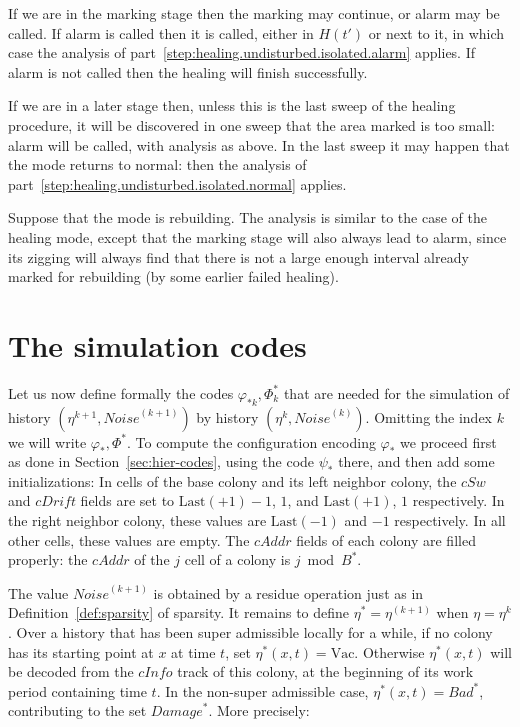 \documentclass[12pt]{memoir}
\newcommand{\authnote}[3]
{\text{{ \textcolor{#3}{\( \langle\hspace{-0.2em}\langle \)\textsf{\footnotesize #1: #2}\( \rangle\hspace{-0.2em}\rangle \)}}}}
\newcommand{\authnote}[2]{}
\newcommand{\Pnote}[1]{{\authnote{Peter}{#1}{cyan}}}
\newcommand{\fld}[1]{\ensuremath{\textit{#1}}}
\def\B{B}
\newcommand{\Bad}{\mathit{Bad}}
\newcommand{\Damage}{\mathit{Damage}}
\renewcommand{\H}{H}
\newcommand{\Noise}{\mathit{Noise}}
\newcommand{\cAddr}{\fld{cAddr}}
\newcommand{\cDrift}{\fld{cDrift}}
\newcommand{\cInfo}{\fld{cInfo}}
\newcommand{\cSweep}{\fld{cSw}}
\newcommand{\Last}{\mathrm{Last}}
\newcommand{\Vacant}{\mathrm{Vac}}
\begin{document}
\begin{Proof}
\begin{prooofi}
If we are in the marking stage then the marking may continue, or alarm may be called.
If alarm is called then it is called, either in \( \H(t') \) or next to it, in which case 
the analysis of part~\ref{step:healing.undisturbed.isolated.alarm} applies.
If alarm is not called then the healing will finish successfully.

If we are in a later stage then, unless this is the last sweep of the healing procedure,
it will be discovered in one sweep that the area marked is too small: alarm will be called,
with analysis as above.
In the last sweep it may happen that the mode returns to normal: then the
analysis of part~\ref{step:healing.undisturbed.isolated.normal} applies.

Suppose that the mode is rebuilding.
The analysis is similar to the case of the healing mode, except that
the marking stage will also always lead to alarm, since its zigging will
always find that there is not a large enough interval already marked for rebuilding
(by some earlier failed healing).
\end{prooofi} %
\end{Proof}


\section{The simulation codes}

Let us now define formally the codes \( \varphi_{*k},\Phi_{k}^{*} \) that are needed
for the simulation of history \( (\eta^{k+1},\Noise^{(k+1)}) \) by history \( (\eta^{k},\Noise^{(k)}) \).
Omitting the index \( k \) we will write \( \varphi_{*},\Phi^{*} \).
To compute the configuration encoding \( \varphi_{*} \) we proceed first as
done in Section~\ref{sec:hier-codes}, using the code \( \psi_{*} \) there,
and then add some initializations:
In cells of the base colony and its left neighbor  colony,
the \( \cSweep \) and \( \cDrift \) fields are set 
to \( \Last(+1)-1 \),  \( 1 \), and \( \Last(+1) \),  \( 1 \) respectively.
In the right neighbor colony, these values are \( \Last(-1) \) and \( -1 \) respectively.
In all other cells, these values are empty.
The \( \cAddr \) fields of each colony are filled properly:
the \( \cAddr \) of the \( j \) cell of a colony
is \( j \bmod \B^* \). \Pnote{Picture?}

The value \( \Noise^{(k+1)} \) is obtained by a residue operation
just as in Definition~\ref{def:sparsity} of sparsity.
It remains to define \( \eta^{*}=\eta^{(k+1)} \) when \( \eta=\eta^{k} \).
Over a history that has been super admissible locally for a while,
if no colony has its starting point at \( x \) at time \( t \), set \( \eta^{*}(x,t)=\Vacant \).
Otherwise \( \eta^{*}(x,t) \) will be decoded from
the \( \cInfo \) track of this colony, at the beginning of its work period 
containing time \( t \).
In the non-super admissible case, \( \eta^{*}(x,t)=\Bad^{*} \), contributing to
the set \( \Damage^{*} \).
More precisely:
\end{document}
